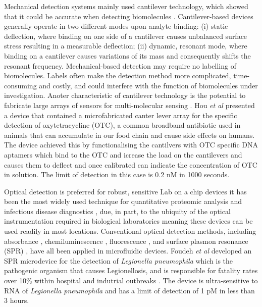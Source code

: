 Mechanical detection systems mainly used cantilever technology, which showed that it could be accurate
when detecting biomolecules \citep{waggoner2007micro}. Cantilever-based devices generally operate in two
different modes upon analyte binding: (i) static deflection, where binding on one side of a cantilever
causes unbalanced surface stress resulting in a measurable deflection; (ii) dynamic, resonant mode, where
binding on a cantilever causes variations of its mass and consequently shifts the resonant frequency.
Mechanical-based detection may require no labelling of biomolecules. Labels often make the detection
method more complicated, time-consuming and costly, and could interfere with the function of biomolecules
under investigation. Anoter characteristic of cantilever technology is the potential to fabricate large
arrays of sensors for multi-molecular sensing \citep{ferrari2005cancer}. Hou \textit{et al} \citep{hou2013aptamer} presented
a device that contained a microfabricated canter lever array  for the  specific detection of
oxytetracycline (OTC), a common broadband antibiotic used in animals that can accumulate in our food chain
and cause side effects on humans. The device achieved this by functionalising the cantilvers with OTC
specific DNA aptamers which bind to the OTC and icrease the load on the cantilevers and causes them
to deflect and once calibrated can indicate the concentration of OTC in solution. The limit of detection
in this case is 0.2 nM in 1000 seconds.

Optical detection is preferred for robust, sensitive Lab on a chip devices it has been the most widely
used technique for quantitative proteomic analysis \citep{rusling2010measurement} and infectious disease
diagnostics \citep{foudeh2012microfluidic}, due, in part, to the ubiquity of the optical instrumentation
required in biological laboratories meaning these devices can be used readily in most locations.
Conventional optical detection methods, including absorbance \citep{wang2011integration},
chemiluminescence \citep{wojciechowski2009organic}, fluorescence \citep{yildirim2012aptamer}, and surface
plasmon resonance (SPR) \citep{foudeh2014sub}, have all been applied in microfluidic devices. Foudeh
\textit{ et al} \citep{foudeh2014sub} developed an SPR microdevice for the detection of
\textit{Legionella pneumophila} which is the pathogenic organism that causes Legionellosis, and
is responsible for fatality rates over 10\% within hospital and indutrial outbreaks
\citep{swanson2000legionella}. The device is ultra-sensitive to RNA of \textit{Legionella pneumophila}
and has a limit of detection of 1 pM in less than 3 hours.


